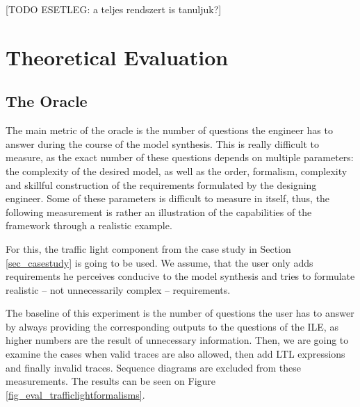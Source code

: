 [TODO ESETLEG: a teljes rendszert is tanuljuk?]

\clearpage
\section{Theoretical Evaluation} \label{sec_theoeval}

\subsection{The Oracle} \label{subs_evaloracle}
The main metric of the oracle is the number of questions the engineer has to answer during the course of the model synthesis. This is really difficult to measure, as the exact number of these questions depends on multiple parameters: the complexity of the desired model, as well as the order, formalism, complexity and skillful construction of the requirements formulated by the designing engineer. Some of these parameters is difficult to measure in itself, thus, the following measurement is rather an illustration of the capabilities of the framework through a realistic example. 

For this, the traffic light component from the case study in Section \ref{sec_casestudy} is going to be used. We assume, that the user only adds requirements he perceives conducive to the model synthesis and tries to formulate realistic -- not unnecessarily complex -- requirements. 

The baseline of this experiment is the number of questions the user has to answer by always providing the corresponding outputs to the questions of the ILE, as higher numbers are the result of unnecessary information. Then, we are going to examine the cases when valid traces are also allowed, then add LTL expressions and finally invalid traces. Sequence diagrams are excluded from these measurements. The results can be seen on Figure \ref{fig_eval_trafficlightformalisms}.

